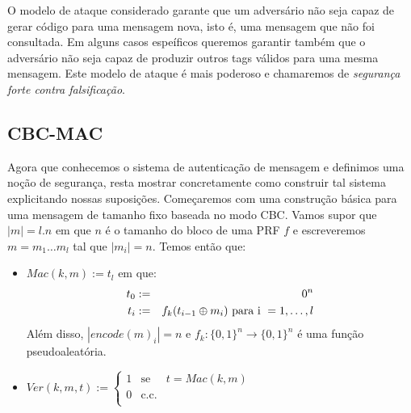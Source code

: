 O modelo de ataque considerado garante que um adversário não seja capaz de gerar código para uma mensagem nova, isto é, uma mensagem que não foi consultada.
Em alguns casos espeíficos queremos garantir também que o adversário não seja capaz de produzir outros tags válidos para uma mesma mensagem.
Este modelo de ataque é mais poderoso e chamaremos de {\em segurança forte contra falsificação}.

\subsection{CBC-MAC}
\label{sec:cbc-mac}

Agora que conhecemos o sistema de autenticação de mensagem e definimos uma noção de segurança, resta mostrar concretamente como construir tal sistema explicitando nossas suposições.
Começaremos com uma construção básica para uma mensagem de tamanho fixo baseada no modo CBC.
Vamos supor que $|m| = l.n$ em que $n$ é o tamanho do bloco de uma PRF $f$ e escreveremos $m = m_1 \dots m_l$ tal que $|m_i| = n$.
Temos então que:


\begin{itemize}
\item $Mac(k, m) := t_l$ em que:
  \begin{eqnarray*}
  t_0 & := & 0^n \\
  t_i & := & f_k(t_{i-1} \oplus m_i) \textrm{ para i } = 1, \dots, l 
  \end{eqnarray*}
 Além disso, $|encode(m)_i| = n$ e $f_k: \{0,1\}^n \to \{0,1\}^n$ é uma função pseudoaleatória.
\item $Ver(k, m, t) :=  \left\{
    \begin{array}{lcl}
      1 & \textrm{se} & t = Mac(k,m)\\
      0 & \textrm{c.c.} &\\
    \end{array}
    \right.$
  \end{itemize}

\begin{center}
\end{center}


